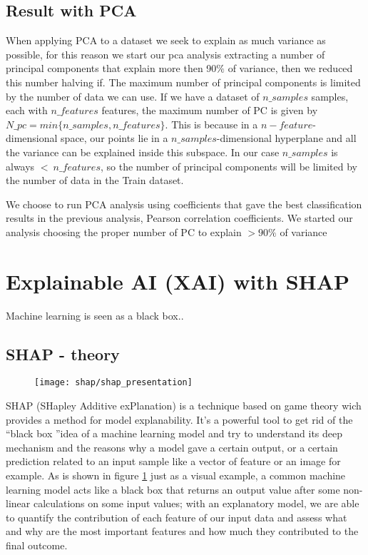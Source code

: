 \documentclass[a4paper,11pt]{article}
\begin{document}
\newpage

\subsection{Result with PCA}

When applying PCA to a dataset we seek to explain as much variance as possible, for this reason we start our pca analysis extracting a number of principal components that explain more then 90$\%$ of variance, then we reduced this number halving if.
The maximum number of principal components is limited by the number of data we can use. If we have a dataset of $n\_samples$ samples, each with $n\_features$ features, the maximum number of PC is given by $N\_pc = min\{n\_samples, n\_features\}$.
This is because in a $n-feature$-dimensional space, our points lie in a $n\_samples$-dimensional hyperplane and all the variance can be explained inside this subspace.
In our case $n\_samples$ is always $< \ n\_features$, so the number of principal components will be limited by the number of data in the Train dataset.

We choose to run PCA analysis using coefficients that gave the best classification results in the previous analysis, Pearson correlation coefficients.
We started our analysis choosing the proper number of PC to explain $> 90\%$ of variance





\newpage

\section{Explainable AI (XAI) with SHAP}

Machine learning is seen as a black box..


\subsection{SHAP - theory}


\begin{figure}[h]
\centering
\texttt{[image: shap/shap\_presentation]}
\caption{}\label{fig:shap_waterfall}
\end{figure}


SHAP (SHapley Additive exPlanation) is a technique based on game theory wich provides a method for model explanability.
It's a powerful tool to get rid of the \textquotedblleft black box \textquotedblright idea of a machine learning model and try to understand its deep mechanism and the reasons why a model gave a certain output, or a certain prediction related to an input sample like a vector of feature or an image for example.
As is shown in figure \ref{fig:shap_waterfall} just as a visual example, a common machine learning model acts like a black box that returns an output value after some non-linear calculations on some input values; with an explanatory model, we are able to quantify the contribution of each feature of our input data and assess what and why are the most important features and how much they contributed to the final outcome.
\end{document}
